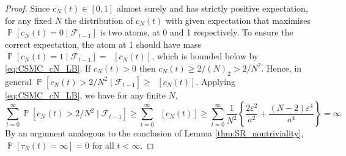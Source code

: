 \documentclass{article} %
\theoremstyle{definition}
\DeclareMathOperator{\Prob}{\mathbb{P}}
\DeclareMathOperator{\Et}{\mathbb{E}_t}
\newcommand{\1}[1]{\mathbbm{1}_{\{#1\}}}
\begin{document}
\begin{proof}
Since $c_N(t) \in [0,1]$ almost surely and has strictly positive expectation, for any fixed $N$ the distribution of $c_N(t)$ with given expectation that maximises $\Prob[ c_N(t)=0 \mid \mathcal{F}_{t-1} ]$ is two atoms, at 0 and 1 respectively. To ensure the correct expectation, the atom at 1 should have mass $\Prob[ c_N(t)=1 \mid \mathcal{F}_{t-1} ] = \Et [ c_N(t) ]$, which is bounded below by \eqref{eq:CSMC_cN_LB}.
If $c_N(t) > 0$ then $c_N(t) \geq 2/(N)_2 > 2/N^2$. Hence, in general $\Prob[ c_N(t) > 2/N^2 \mid \mathcal{F}_{t-1} ] \geq \Et [c_N(t)]$. Applying \eqref{eq:CSMC_cN_LB}, we have for any finite $N$,
\begin{equation*}
\sum_{t=0}^\infty \Prob[ c_N(t) > 2/N^2 \mid \mathcal{F}_{t-1} ]
\geq \sum_{t=0}^\infty \Et [ c_N(t) ]
\geq \sum_{t=0}^\infty \frac{1}{N^2} \left\{\frac{2\varepsilon^2}{a^2} + \frac{(N-2)\varepsilon^4}{a^4}  \right\}
= \infty
\end{equation*}
By an argument analogous to the conclusion of Lemma \ref{thm:SR_nontriviality}, $\Prob[ \tau_N(t) = \infty ] =0$ for all $t < \infty$.
\end{proof}
\end{document}
